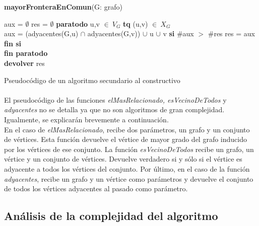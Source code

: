 \vspace{3em}

\textbf{mayorFronteraEnComun}(G: grafo) \\
\begin{algorithm}[H]
	\BlankLine
	aux = $\emptyset$
	res = $\emptyset$
	\textbf{paratodo} u,v $\in\ V_{G}$ \textbf{tq} (u,v) $\in\ X_{G}$ \\
		\tab aux = (adyacentes(G,u) $\cap$ adyacentes(G,v)) $\cup$ u $\cup$ v
		\tab \textbf{si} \#aux $>$ \#res
			\tab \tab res = aux
		\tab \textbf{fin si}\\
	\textbf{fin paratodo}\\

	\textbf{devolver} res

\caption{Pseudocódigo de un algoritmo secundario al constructivo}
\end{algorithm}
 
\normalsize

\paragraph{}
El pseudocódigo de las funciones \textit{elMasRelacionado, esVecinoDeTodos} y \textit{adyacentes} no se detalla ya que no son algoritmos de gran complejidad. Igualmente, se explicarán brevemente a continuación.\\
En el caso de \textit{elMasRelacionado}, recibe dos parámetros, un grafo y un conjunto de vértices. Esta función devuelve el vértice de mayor grado del grafo inducido por los vértices de ese conjunto. La función \textit{esVecinoDeTodos} recibe un grafo, un vértice y un conjunto de vértices. Devuelve verdadero si y sólo si el vértice es adyacente a todos los vértices del conjunto. Por último, en el caso de la función \textit{adyacentes}, recibe un grafo y un vértice como parámetros y devuelve el conjunto de todos los vértices adyacentes al pasado como parámetro.


\subsection{Análisis de la complejidad del algoritmo}
\label{complejidad3}
